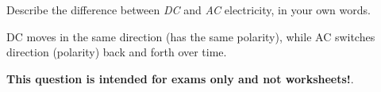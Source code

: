 

Describe the difference between {\it DC} and {\it AC} electricity, in your own words.







DC moves in the same direction (has the same polarity), while AC switches direction (polarity) back and forth over time.







{\bf This question is intended for exams only and not worksheets!}.



